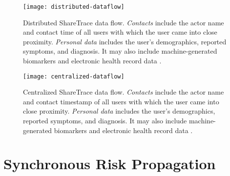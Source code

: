\begin{figure}[htb]
    \texttt{[image: distributed-dataflow]}
    \caption[Distributed ShareTrace data flow]{Distributed ShareTrace data flow. \emph{Contacts} include the actor name and contact time of all users with which the user came into close proximity. \emph{Personal data} includes the user's demographics, reported symptoms, and diagnosis. It may also include machine-generated biomarkers and electronic health record data \cite{Ayday2020}.}
    \label{fig:distributed-dataflow}
\end{figure}

\begin{figure}[htb]
    \texttt{[image: centralized-dataflow]}
    \caption[Centralized ShareTrace data flow]{Centralized ShareTrace data flow. \emph{Contacts} include the actor name and contact timestamp of all users with which the user came into close proximity. \emph{Personal data} includes the user's demographics, reported symptoms, and diagnosis. It may also include machine-generated biomarkers and electronic health record data \cite{Ayday2020}.}
    \label{fig:centralized-dataflow}
\end{figure}

\section{Synchronous Risk Propagation}


%
%
%

